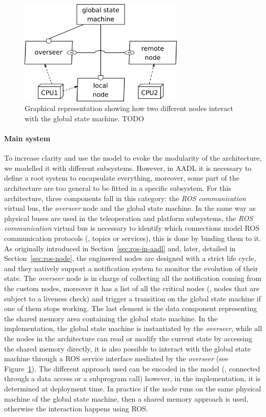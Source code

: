 \begin{figure}[t]
\centering
\includegraphics[width=0.7\textwidth]{gfx/pmk/overseer}
\caption{Graphical representation showing how two different nodes interact with the global state machine. TODO}
\label{fig:pmk-gsm}
\end{figure}

\paragraph{Main system} To increase clarity and use the model to evoke the modularity of the architecture, we modelled it with different subsystems. However, in AADL it is necessary to define a root system to encapsulate everything, moreover, some part of the architecture are too general to be fitted in a specific subsystem. For this architecture, three components fall in this category: the \textit{ROS communication} virtual bus, the \textit{overseer} node and the global state machine. In the same way as physical buses are used in the teleoperation and platform subsystems, the \textit{ROS communication} virtual bus is necessary to identify which connections model ROS communication protocols (\ie, topics or services), this is done by binding them to it. As originally introduced in Section~\ref{sec:ros-in-aadl} and, later, detailed in Section~\ref{sec:ros-node}, the engineered nodes are designed with a strict life cycle, and they natively support a notification system to monitor the evolution of their state. The \textit{overseer} node is in charge of collecting all the notification coming from the custom nodes, moreover it has a list of all the critical nodes (\ie, nodes that are subject to a liveness check) and trigger a transition on the global state machine if one of them stops working. The last element is the data component representing the shared memory area containing the global state machine. In the implementation, the global state machine is instantiated by the \textit{overseer}, while all the nodes in the architecture can read or modify the current state by accessing the shared memory directly, it is also possible to interact with the global state machine through a ROS service interface mediated by the \textit{overseer} (see Figure~\ref{fig:pmk-gsm}). The different approach used can be encoded in the model (\ie, connected through a data access or a subprogram call) however, in the implementation, it is determined at deployment time. In practice if the node runs on the same physical machine of the global state machine, then a shared memory approach is used, otherwise the interaction happens using ROS. 

